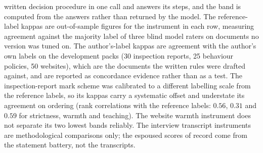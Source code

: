 \begin{table}[htbp]
\begin{minipage}{0.92\linewidth}
written decision procedure in one call and answers its steps, and the band is
computed from the answers rather than returned by the model. The
reference-label kappas are out-of-sample figures for the instrument in each
row, measuring agreement against the majority label of three blind model
raters on documents no version was tuned on. The author's-label kappas are
agreement with the author's own labels on the development packs (30
inspection reports, 25 behaviour policies, 50 websites), which are the
documents the written rules were drafted against, and are reported as
concordance evidence rather than as a test. The
inspection-report mark scheme was calibrated to a different labelling scale from
the reference labels, so its kappas carry a systematic offset and understate
its agreement on ordering (rank correlations with the reference labels:
$0.56$, $0.31$ and $0.59$ for strictness, warmth and teaching). The website warmth instrument does not separate its
two lowest bands reliably. The interview transcript instruments are
methodological comparisons only; the espoused scores of record come from the
statement battery, not the transcripts.
\end{minipage}
\end{table}
